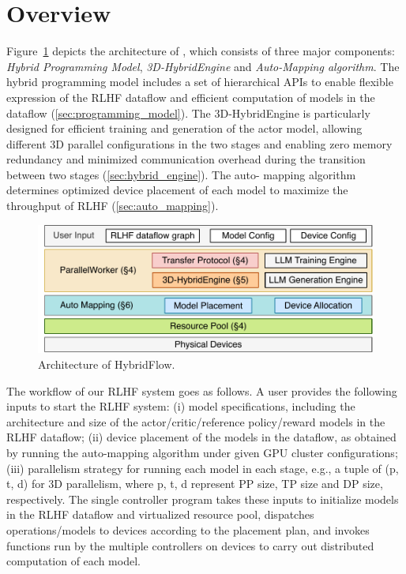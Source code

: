 \vspace{-2mm}
\section{\sysname{} Overview} \label{sec:design}

Figure~\ref{fig:architecture} depicts the architecture of \sysname{}, which consists of three major components: 
\textit{Hybrid Programming Model}, \textit{3D-HybridEngine} and \textit{Auto-Mapping algorithm}.
The hybrid programming model includes a set of hierarchical APIs to enable flexible expression of the RLHF dataflow and efficient computation of models in the dataflow (\textsection\ref{sec:programming_model}). The 3D-HybridEngine is particularly designed for efficient training and generation of the actor model, allowing different 3D parallel configurations 
in the two stages and %
enabling zero memory redundancy and minimized communication overhead during the transition between two stages (\textsection\ref{sec:hybrid_engine}).
The auto- mapping algorithm determines optimized device %
placement of each model to maximize the throughput of RLHF (\textsection\ref{sec:auto_mapping}).





\begin{figure}[t]
    \includegraphics[width=\linewidth]{figs/fig_architecture.pdf}
    \vspace{-5mm}
    \caption{Architecture of HybridFlow. 
    }
    \vspace{-6mm}
    \label{fig:architecture}
\end{figure}


The workflow of our RLHF system goes as follows. A user provides the following inputs to start the RLHF system: (i) model specifications, including
{the architecture and size}
of the actor/critic/reference policy/reward models in the RLHF dataflow;
(ii) device placement of the models in the dataflow, as obtained by running the auto-mapping algorithm under given GPU cluster configurations; (iii) parallelism strategy for running each model in each stage, e.g., a tuple of (p, t, d) for 3D parallelism, where p, t, d represent PP size, TP size and DP size, respectively. %
The single controller program takes these inputs to initialize models in the RLHF dataflow and virtualized resource pool, dispatches operations/models to devices according to the placement plan, and invokes functions run by the multiple controllers on devices to carry out distributed computation of each model.

